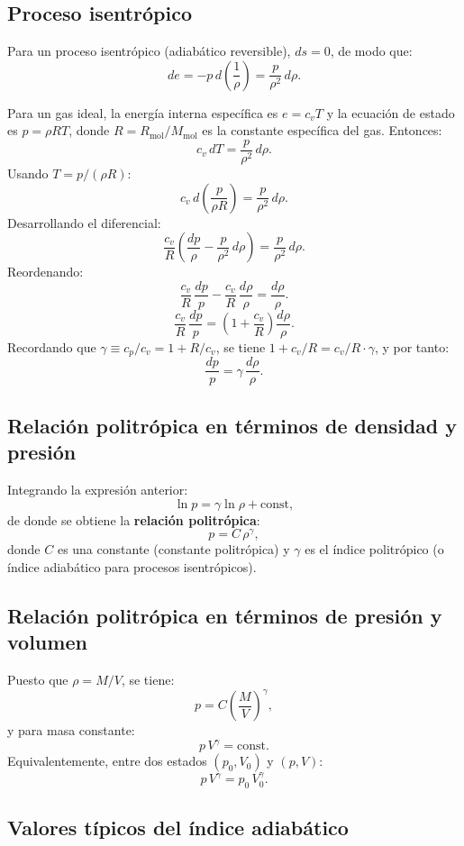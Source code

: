 \subsection{Proceso isentrópico}

Para un proceso isentrópico (adiabático reversible), $ds = 0$, de modo que:
$$
de = -p\,d\!\left(\frac{1}{\rho}\right) = \frac{p}{\rho^2}\,d\rho.
$$

Para un gas ideal, la energía interna específica es $e = c_v T$ y la ecuación de estado es $p = \rho R T$, donde $R = R_{\text{mol}}/M_{\text{mol}}$ es la constante específica del gas. Entonces:
$$
c_v\,dT = \frac{p}{\rho^2}\,d\rho.
$$
Usando $T = p/(\rho R)$:
$$
c_v\,d\!\left(\frac{p}{\rho R}\right) = \frac{p}{\rho^2}\,d\rho.
$$
Desarrollando el diferencial:
$$
\frac{c_v}{R}\left(\frac{dp}{\rho} - \frac{p}{\rho^2}\,d\rho\right) = \frac{p}{\rho^2}\,d\rho.
$$
Reordenando:
$$
\frac{c_v}{R}\,\frac{dp}{p} - \frac{c_v}{R}\,\frac{d\rho}{\rho} = \frac{d\rho}{\rho}.
$$
$$
\frac{c_v}{R}\,\frac{dp}{p} = \left(1 + \frac{c_v}{R}\right)\frac{d\rho}{\rho}.
$$
Recordando que $\gamma \equiv c_p/c_v = 1 + R/c_v$, se tiene $1 + c_v/R = c_v/R \cdot \gamma$, y por tanto:
$$
\frac{dp}{p} = \gamma\,\frac{d\rho}{\rho}.
$$

\subsection{Relación politrópica en términos de densidad y presión}

Integrando la expresión anterior:
$$
\ln p = \gamma \ln \rho + \text{const},
$$
de donde se obtiene la \textbf{relación politrópica}:
$$
\boxed{p = C\,\rho^{\gamma},}
$$
donde $C$ es una constante (constante politrópica) y $\gamma$ es el índice politrópico (o índice adiabático para procesos isentrópicos).

\subsection{Relación politrópica en términos de presión y volumen}

Puesto que $\rho = M/V$, se tiene:
$$
p = C\left(\frac{M}{V}\right)^{\gamma},
$$
y para masa constante:
$$
p\,V^{\gamma} = \text{const}.
$$
Equivalentemente, entre dos estados $(p_0, V_0)$ y $(p, V)$:
$$
\boxed{p\,V^{\gamma} = p_0\,V_0^{\gamma}.}
$$

\figuraProcesoPolitropico

\subsection{Valores típicos del índice adiabático}

